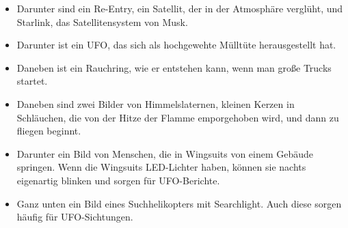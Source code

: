 \documentclass{scrartcl}
\begin{document}
\begin{itemize}
    \begin{figure}[h]
        \centering
        \begin{minipage}[b]{0.45\linewidth}
        \end{minipage}
        \hfill
        \begin{minipage}[b]{0.45\linewidth}
        \end{minipage}
    \end{figure}


    \item Darunter sind ein Re-Entry, ein Satellit, der in der Atmosphäre verglüht, und Starlink, das Satellitensystem von Musk.  
    \item Darunter ist ein UFO, das sich als hochgewehte Mülltüte herausgestellt hat.
    \item Daneben ist ein Rauchring, wie er entstehen kann, wenn man große Trucks startet. 
    \item Daneben sind zwei Bilder von Himmelslaternen, kleinen Kerzen in \frq Schläuchen\flq, die von der Hitze der Flamme emporgehoben wird, und dann zu fliegen beginnt.
    \item Darunter ein Bild von Menschen, die in Wingsuits von einem Gebäude springen. Wenn die Wingsuits LED-Lichter haben, können sie nachts eigenartig blinken und sorgen für UFO-Berichte.
    \item Ganz unten ein Bild eines Suchhelikopters mit Searchlight. Auch diese sorgen häufig für UFO-Sichtungen.
\end{itemize}
\end{document}

